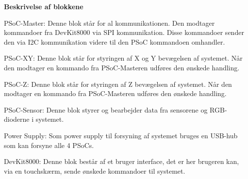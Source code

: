 \textbf{Beskrivelse af blokkene}

PSoC-Master: Denne blok står for al kommunikationen. Den modtager kommandoer fra DevKit8000 via SPI kommunikation. Disse kommandoer sender den via I2C kommunikation videre til den PSoC kommandoen omhandler.

PSoC-XY: Denne blok står for styringen af X og Y bevægelsen af systemet. Når den modtager en kommando fra PSoC-Masteren udføres den ønskede handling. 

PSoC-Z: Denne blok står for styringen af Z bevægelsen af systemet. Når den modtager en kommando fra PSoC-Masteren udføres den ønskede handling.

PSoC-Sensor: Denne blok styrer og bearbejder data fra sensorene og RGB-dioderne i systemet.

Power Supply: Som power supply til forsyning af systemet bruges en USB-hub som kan forsyne alle 4 PSoCs.

DevKit8000: Denne blok består af et bruger interface, det er her brugeren kan, via en touchskærm, sende ønskede kommandoer til systemet. 
